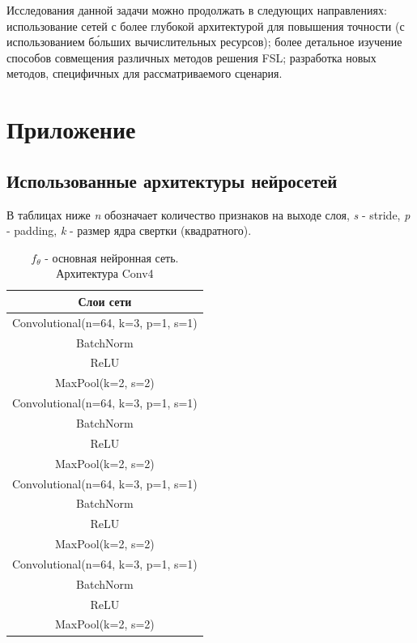 \documentclass[a4paper, 12pt]{report}
\begin{document}
Исследования данной задачи можно продолжать в следующих направлениях: использование сетей с более глубокой архитектурой для повышения точности (с использованием б\'{о}льших вычислительных ресурсов); более детальное изучение способов совмещения различных методов решения FSL; разработка новых методов, специфичных для рассматриваемого сценария.




\chapter{Приложение}

\section {Использованные архитектуры нейросетей}

В таблицах ниже \textit{n} обозначает количество признаков на выходе слоя, \textit{s} - stride, \textit{p} - padding, \textit{k} - размер ядра свертки (квадратного).

\begin{table}[H]
\begin{adjustbox}{center}
\begin{tabular}{| c | }
\hline
Слои сети \\
\hline
Convolutional(n=64, k=3, p=1, s=1) \\
\hline
BatchNorm \\
\hline
ReLU \\
\hline
MaxPool(k=2, s=2) \\
\hline
Convolutional(n=64, k=3, p=1, s=1) \\
\hline
BatchNorm \\
\hline
ReLU \\
\hline
MaxPool(k=2, s=2) \\
\hline
Convolutional(n=64, k=3, p=1, s=1) \\
\hline
BatchNorm \\
\hline
ReLU \\
\hline
MaxPool(k=2, s=2) \\
\hline
Convolutional(n=64, k=3, p=1, s=1) \\
\hline
BatchNorm \\
\hline
ReLU \\
\hline
MaxPool(k=2, s=2) \\
\hline
\end{tabular}
\end{adjustbox}
\caption{\centering $f_{\theta}$ - основная нейронная сеть. Архитектура Conv4 \cite{dfmn}}
\end{table}
\end{document}
